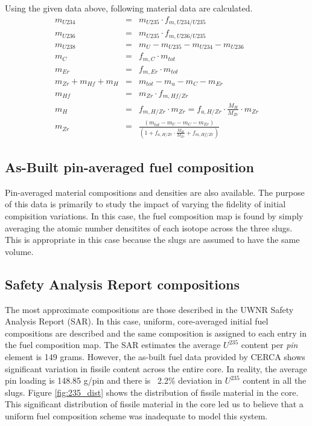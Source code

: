 \documentclass{UWNR_modeling}
\begin{document}
Using the given data above, following material data are calculated.
\begin{eqnarray*}
m_{U234} &=& m_{U235} \cdot f_{m,U234/U235}\\
m_{U236} &=& m_{U235} \cdot f_{m,U236/U235}\\
m_{U238} &=& m_{U} - m_{U235} - m_{U234} - m_{U236}\\
m_{C} &=&  f_{m,C} \cdot m_{tot}\\
m_{Er} &=&  f_{m,Er} \cdot m_{tot}\\
m_{Zr} + m_{Hf} + m_{H} &=& m_{tot} - m_u - m_C - m_{Er}\\
m_{Hf} &=& m_{Zr} \cdot f_{m,Hf/Zr}\\
m_H &=& f_{m,H/Zr} \cdot m_{Zr} = f_{a,H/Zr} \cdot \frac{M_H}{M_{Zr}} \cdot m_{Zr}\\
m_{Zr} &=& \frac{(m_{tot} - m_{U} - m_{C} - m_{Er})}{(1 + f_{a,H/Zr}\cdot \frac{M_{H}}{M_{Zr}} + f_{m,Hf/Zr})}
\end{eqnarray*}

\subsection{As-Built pin-averaged fuel composition}

Pin-averaged material compositions and densities are also available.  The purpose of this data is primarily to study the impact of varying the fidelity of initial compisition variations.  In this case, the fuel composition map is found by simply averaging the atomic number densitites of each isotope across the three slugs.  This is appropriate in this case because the slugs are assumed to have the same volume.

\subsection{Safety Analysis Report compositions}

The most approximate compositions are those described in the UWNR Safety Analysis Report (SAR).  In this case, uniform, core-averaged initial fuel compositions are described and the same composition is assigned to each entry in the fuel composition map.  The SAR estimates the average $U^{235}$ content per \emph{pin} element is 149 grams\cite{SAR}. However, the as-built fuel data provided by CERCA shows significant variation in fissile content across the entire core. In reality, the average pin loading is 148.85 g/pin and there is ~2.2\% deviation in $U^{235}$ content in all the slugs. Figure \ref{fig:235_dist} shows the distribution of fissile material in the core. This significant distribution of fissile material in the core led us to believe that a uniform fuel composition scheme was inadequate to model this system.
\end{document}
